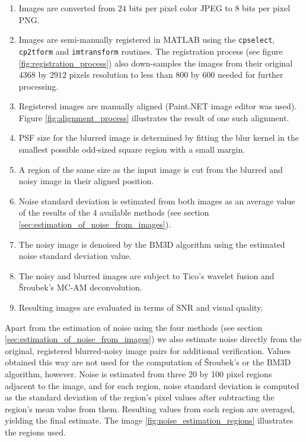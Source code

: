 \documentclass[12pt,notitlepage]{report}
\begin{document}
\begin{enumerate}
\item Images are converted from $24$ bits per pixel color JPEG to $8$ bits per pixel PNG.
\item Images are semi-manually registered in MATLAB using the \texttt{cpselect}, \texttt{cp2tform} and \texttt{imtransform} routines. The registration process (see figure \ref{fig:registration_process}) also down-samples the images from their original $4368$ by $2912$ pixels resolution to less than $800$ by $600$ needed for further processing. 
\item Registered images are manually aligned (Paint.NET image editor was used). Figure \ref{fig:alignment_process} illustrates the result of one such alignment.
\item PSF size for the blurred image is determined by fitting the blur kernel in the smallest possible odd-sized square region with a small margin.
\item A region of the same size as the input image is cut from the blurred and noisy image in their aligned position.
\item Noise standard deviation is estimated from both images as an average value of the results of the 4 available methods (see section \ref{sec:estimation_of_noise_from_images}).
\item The noisy image is denoised by the BM3D algorithm using the estimated noise standard deviation value.
\item The noisy and blurred images are subject to Tico's wavelet fusion and Šroubek's MC-AM deconvolution.
\item Resulting images are evaluated in terms of SNR and visual quality.
\end{enumerate}

Apart from the estimation of noise using the four methods (see section \ref{sec:estimation_of_noise_from_images}) we also estimate noise directly from the original, registered  blurred-noisy image pairs for additional verification. Values obtained this way are not used for the computation of Šroubek's or the BM3D algorithm, however. Noise is estimated from three 20 by 100 pixel regions adjacent to the image, and for each region, noise standard deviation is computed as the standard deviation of the region's pixel values after subtracting the region's mean value from them. Resulting values from each region are averaged, yielding the final estimate. The image \ref{fig:noise_estimation_regions} illustrates the regions used. 
\end{document}
